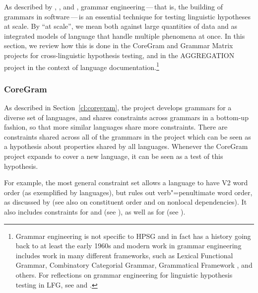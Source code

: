 \documentclass[output=paper
 	        ,biblatex
                ,babelshorthands
                ,newtxmath
                ,draftmode
                ,colorlinks, citecolor=brown
]{langscibook}
\begin{document}
%
%
As described by \citet[]{Mueller99a}, \citet{Bender2008c}, and \citet{BFO2011a-u},
grammar engineering\,---\,that is, the building of grammars in software\,---\,is
an essential technique for testing linguistic hypotheses at scale. By
``at scale'', we mean both against large quantities of data and as
integrated models of language that handle multiple phenomena at
once. In this section, we review how this is done in the CoreGram
and Grammar Matrix projects for cross-linguistic hypothesis testing,
and in the AGGREGATION project in the context of language
documentation.\footnote{Grammar engineering is not specific to HPSG and
in fact has a history going back to at least the early 1960s \citep{Kay:63,ZFHW65a,Petrick65a-u,FBDPM71a-u}
and modern work in grammar engineering includes work in many different frameworks, such as Lexical Functional Grammar\indexlfg \citep{BKNS99a-ed}, Combinatory Categorial
Grammar\indexccg \citep{BCPW2007a}, Grammatical Framework \citep{Ranta:09}, and others.
For reflections on grammar engineering for linguistic hypothesis testing
in LFG, see \citet{BKNS99a-ed} and \citet{King:16}.}
%


\subsubsection{CoreGram}
\label{cl:lang-doc:coregram}

As described in Section~\ref{cl:coregram},
the  project develops grammars for a diverse set of languages,
and shares constraints across grammars in a bottom-up fashion, so that more
similar languages share more constraints. There are constraints
shared across all of the grammars in the project which can be seen
as a hypothesis about properties shared by all languages.
Whenever the CoreGram project expands to cover a new language,
it can be seen as a test of this hypothesis.

For example, the most general constraint set
allows a language to have V2 word order
(as exemplified by  languages),
but rules out verb"=penultimate word order,
as discussed by \citet[--46]{MuellerCoreGram}
(see also  on constituent order and  on nonlocal dependencies).
It also includes constraints for  and 
(see ),
as well as for 
(see ).
\end{document}
